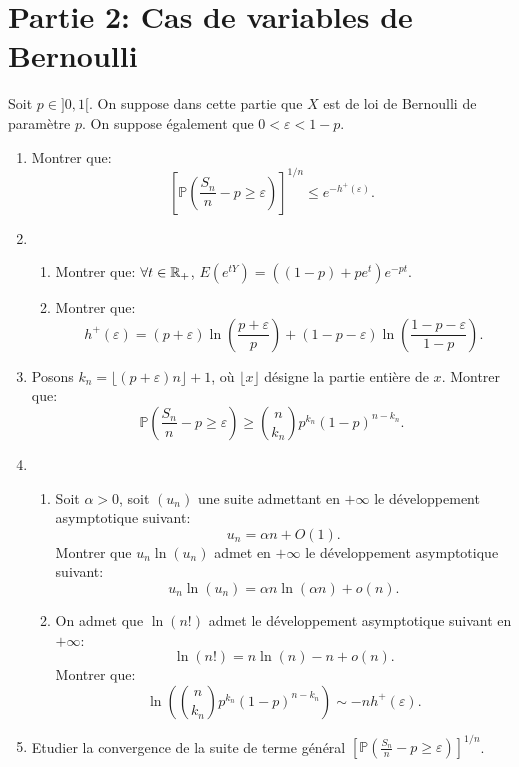 \section*{Partie 2: Cas de variables de Bernoulli}
Soit $p\in ]0,1[$. On suppose dans cette partie que $X$ est de loi de Bernoulli de paramètre $p$. On suppose également que $0 < \varepsilon < 1-p$. 

\begin{enumerate}


\item Montrer que:
\begin{displaymath}
  \left [\mathbb{P}\left ( \frac{S_{n}}{n}-p \geq \varepsilon \right )\right ]^{1/n}\leq e^{-h^{+}(\varepsilon)}.
\end{displaymath}




\medskip


\item \begin{enumerate}
           \item Montrer que: $\forall t\in \mathbb{R}_{+}$, $\displaystyle{E\left ( e^{tY}\right ) = ((1-p) + pe^{t})e^{-pt}}$. 
           \item Montrer que:
\[h^{+}(\varepsilon) = (p+\varepsilon)\ln \left ( \frac{p+\varepsilon}{p}\right ) + (1-p-\varepsilon)\ln \left ( \frac{1-p-\varepsilon}{1-p}\right ).\]
          \end{enumerate}

 
\medskip


\item Posons $k_{n} = \lfloor (p+\varepsilon) n\rfloor + 1$, où $\lfloor x\rfloor$ désigne la partie entière de $x$. Montrer que:
\[ \mathbb{P}\left ( \frac{S_{n}}{n}-p\geq \varepsilon \right ) \geq \binom{n}{k_{n}}p^{k_{n}}(1-p)^{n-k_{n}}.\]


\medskip


\item \begin{enumerate}
           \item Soit $\alpha >0$, soit $(u_{n})$ une suite admettant en $+\infty$ le développement asymptotique suivant:
           \[ u_{n} = \alpha n + O(1).\]
           Montrer que $u_{n}\ln (u_{n})$ admet en $+\infty$ le développement asymptotique suivant:
           \[ u_{n}\ln (u_{n}) =  \alpha n \ln (\alpha n) + o(n).\]
           \item On admet que $\ln (n!)$ admet le développement asymptotique suivant en $+\infty$: 
\[ \ln (n!)= n\ln (n) - n + o(n).\]
Montrer que:
\[ \ln \left ( \binom{n}{k_{n}}p^{k_{n}}(1-p)^{n-k_{n}} \right ) \sim -nh^{+}(\varepsilon ).\]

          \end{enumerate}


\medskip


\item Etudier la convergence de la suite de terme général $\displaystyle{\left [\mathbb{P}\left ( \frac{S_{n}}{n}-p\geq \varepsilon \right )\right ]^{1/n}}$.
 
\end{enumerate}
